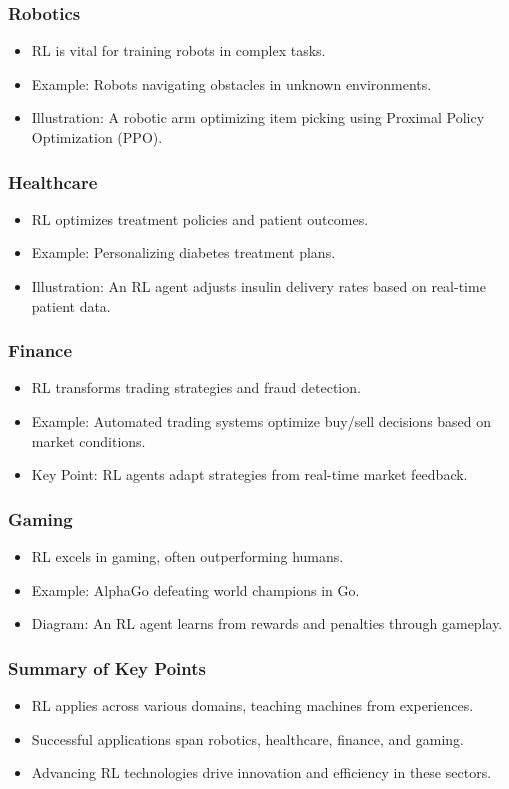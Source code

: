 \documentclass{beamer}
\begin{document}
\begin{frame}
    \frametitle{Robotics}
    \begin{itemize}
        \item RL is vital for training robots in complex tasks.
        \item Example: Robots navigating obstacles in unknown environments.
        \item Illustration: A robotic arm optimizing item picking using Proximal Policy Optimization (PPO).
    \end{itemize}
\end{frame}

\begin{frame}
    \frametitle{Healthcare}
    \begin{itemize}
        \item RL optimizes treatment policies and patient outcomes.
        \item Example: Personalizing diabetes treatment plans.
        \item Illustration: An RL agent adjusts insulin delivery rates based on real-time patient data.
    \end{itemize}
\end{frame}

\begin{frame}
    \frametitle{Finance}
    \begin{itemize}
        \item RL transforms trading strategies and fraud detection.
        \item Example: Automated trading systems optimize buy/sell decisions based on market conditions.
        \item Key Point: RL agents adapt strategies from real-time market feedback.
    \end{itemize}
\end{frame}

\begin{frame}
    \frametitle{Gaming}
    \begin{itemize}
        \item RL excels in gaming, often outperforming humans.
        \item Example: AlphaGo defeating world champions in Go.
        \item Diagram: An RL agent learns from rewards and penalties through gameplay.
    \end{itemize}
\end{frame}

\begin{frame}
    \frametitle{Summary of Key Points}
    \begin{itemize}
        \item RL applies across various domains, teaching machines from experiences.
        \item Successful applications span robotics, healthcare, finance, and gaming.
        \item Advancing RL technologies drive innovation and efficiency in these sectors.
    \end{itemize}
\end{frame}
\end{document}
